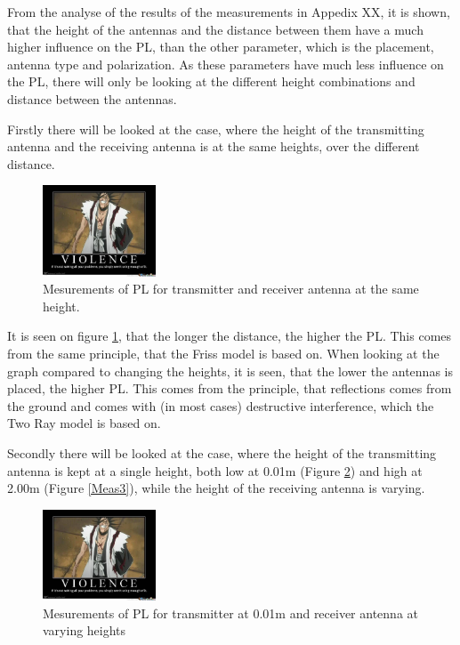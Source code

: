 From the analyse of the results of the measurements in Appedix XX, it is shown, that the height of the antennas and the distance between them have a much higher influence on the PL, than the other parameter, which is the placement, antenna type and polarization. As these parameters have much less influence on the PL, there will only be looking at the different height combinations and distance between the antennas.

Firstly there will be looked at the case, where the height of the transmitting antenna and the receiving antenna is at the same heights, over the different distance.

\begin{figure}
\centering
\includegraphics[width=0.3\textwidth]{figures/bleach-3712665.jpg}
\caption{Mesurements of PL for transmitter and receiver antenna at the same height.}
\label{Meas1}
\end{figure}

It is seen on figure \ref{Meas1}, that the longer the distance, the higher the PL. This comes from the same principle, that the Friss model is based on. When looking at the graph compared to changing the heights, it is seen, that the lower the antennas is placed, the higher PL. This comes from the principle, that reflections comes from the ground and comes with (in most cases) destructive interference, which the Two Ray model is based on. 

Secondly there will be looked at the case, where the height of the transmitting antenna is kept at a single height, both low at 0.01m (Figure \ref{Meas2}) and high at 2.00m (Figure \ref{Meas3}), while the height of the receiving antenna is varying.

\begin{figure}
\centering
\includegraphics[width=0.3\textwidth]{figures/bleach-3712665.jpg}
\caption{Mesurements of PL for transmitter at 0.01m and receiver antenna at varying heights}
\label{Meas2}
\end{figure}

